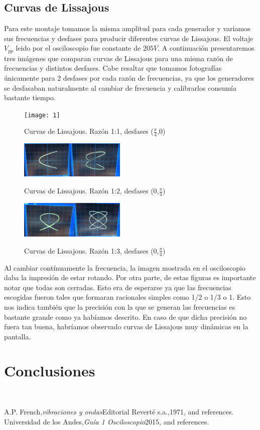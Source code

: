 \documentclass[%
 reprint,
 amsmath,amssymb,
 aps,
]{revtex4-1}
\begin{document}
\subsection{\label{sec:level2}Curvas de Lissajous}
Para este montaje tomamos la misma amplitud para cada generador y variamos sus frecuencias y desfases para producir diferentes curvas de Lissajous. El voltaje $V_{pp}$ leido por el osciloscopio fue constante de $205V$. A continuación presentaremos tres imágenes que comparan curvas de Lissajous para una misma razón de frecuencias y distintos desfases. Cabe resaltar que tomamos fotografías únicamente para 2 desfases por cada razón de frecuencias, ya que los generadores se desfasaban naturalmente al cambiar de frecuencia y calibrarlos consumía bastante tiempo.\\

\begin{figure}[h!]
\caption{ Curvas de Lissajous. Razón 1:1, desfases ($\frac{\pi}{4}$,0) }
\centering
\texttt{[image: 1]}
\label{fig:amortiguado}
\end{figure}

\begin{figure}[h!]
\caption{ Curvas de Lissajous. Razón 1:2, desfases (0,$\frac{\pi}{4}$) }
\centering
\includegraphics[width=0.45\textwidth]{2}
\label{fig:amortiguado}
\end{figure}

\begin{figure}[h!]
\caption{ Curvas de Lissajous. Razón 1:3, desfases (0,$\frac{\pi}{4}$) }
\centering
\includegraphics[width=0.45\textwidth]{3}
\label{fig:amortiguado}
\end{figure}

Al cambiar contínuamente la frecuencia, la imagen mostrada en el osciloscopio daba la impresión de estar rotando. Por otra parte, de estas figuras es importante notar que todas son cerradas. Esto era de esperarse ya que las frecuencias escogidas fueron tales que formaran racionales simples como 1/2 o 1/3 o 1. Esto nos indica también que la precisión con la que se generan las frecuencias es bastante grande como ya habíamos descrito. En caso de que dicha precisión no fuera tan buena, habríamos observado curvas de Lissajous muy dinámicas en la pantalla.\\


\section{\label{sec:level1}Conclusiones}
 \ \\


\begin{thebibliography}{99} 
 A.P. French,{\it vibraciones y ondas}{Editorial Reverté s.a.,1971}, and references.\\ 
 Universidad de los Andes,{\it Guía 1 Osciloscopio}{2015}, and references.\\ \end{thebibliography}
\end{document}
